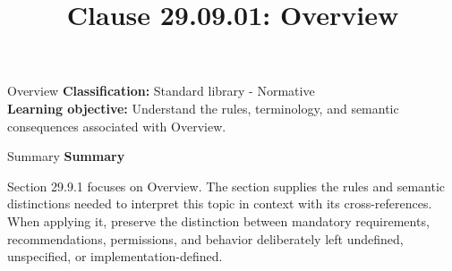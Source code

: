 \documentclass[10pt,letterpaper]{article}
\title{Clause 29.09.01: Overview}
\author{}
\date{}
\begin{document}
\maketitle
\begin{CornellOverviewBox}{Overview}
\textbf{Classification:} Standard library - Normative\\[2pt]
\textbf{Learning objective:} Understand the rules, terminology, and semantic consequences associated with Overview.
\end{CornellOverviewBox}\begin{CornellSummaryBox}{Summary}
{\sffamily\bfseries\color{Accent} Summary}\par\vspace{3pt}Section 29.9.1 focuses on Overview. The section supplies the rules and semantic distinctions needed to interpret this topic in context with its cross-references. When applying it, preserve the distinction between mandatory requirements, recommendations, permissions, and behavior deliberately left undefined, unspecified, or implementation-defined.
\end{CornellSummaryBox}
\end{document}
